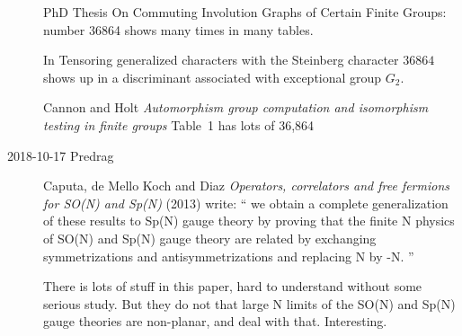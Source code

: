 \begin{description}
PhD Thesis
{On Commuting Involution Graphs of Certain Finite Groups}:  number 36864
shows many times in many tables.

In  {Tensoring generalized characters
with the Steinberg character}
$36864$ shows up in a discriminant associated with exceptional group
$G_2$.

 {Cannon and Holt}
{\em Automorphism group computation and
isomorphism testing in finite groups} Table~1 has lots of 36,864

\item[2018-10-17 Predrag]
Caputa, de Mello Koch and Diaz
{\em Operators, correlators and free fermions for {SO(N) and Sp(N)}} (2013)
write: ``
we obtain a complete generalization of these results to Sp(N) gauge theory by
proving that the finite N physics of SO(N) and Sp(N) gauge theory are related
by exchanging symmetrizations and antisymmetrizations and replacing N by -N.
''

There is lots of stuff in this paper, hard to understand without some serious study.
But they do not that large N limits of the SO(N) and Sp(N) gauge theories
are non-planar, and deal with that. Interesting.



\end{description}


\printbibliography[heading=subbibintoc,title={References}]
